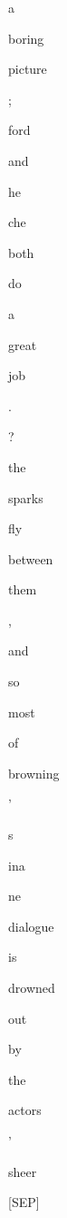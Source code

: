 \documentclass[varwidth=150mm]{standalone}
\begin{document}
\begin{CJK*}{UTF8}{gbsn}
{{{\colorbox{red!2.252366542816162}{\strut a} \colorbox{red!0.0}{\strut boring} \colorbox{red!11.16667366027832}{\strut picture} \colorbox{red!1.7491276264190674}{\strut ;} \colorbox{red!4.821642875671387}{\strut ford} \colorbox{red!0.0}{\strut and} \colorbox{red!0.0}{\strut he}\colorbox{red!1.1487184762954712}{\strut che} \colorbox{red!0.0}{\strut both} \colorbox{red!0.0}{\strut do} \colorbox{red!0.0}{\strut a} \colorbox{red!0.0}{\strut great} \colorbox{red!2.1898319721221924}{\strut job} \colorbox{red!1.303698182106018}{\strut .} \colorbox{red!18.185821533203125}{\strut ?} \colorbox{red!4.2095866203308105}{\strut the} \colorbox{red!1.4970024824142456}{\strut sparks} \colorbox{red!1.4905855655670166}{\strut fly} \colorbox{red!0.0}{\strut between} \colorbox{red!2.865899085998535}{\strut them} \colorbox{red!0.0}{\strut ,} \colorbox{red!9.971415519714355}{\strut and} \colorbox{red!3.6003265380859375}{\strut so} \colorbox{red!0.0}{\strut most} \colorbox{red!1.2356929779052734}{\strut of} \colorbox{red!4.911710262298584}{\strut browning} \colorbox{red!1.8380047082901}{\strut '} \colorbox{red!2.6674582958221436}{\strut s} \colorbox{red!10.292791366577148}{\strut ina}\colorbox{red!4.768868446350098}{\strut ne} \colorbox{red!29.677532196044922}{\strut dialogue} \colorbox{red!2.2694103717803955}{\strut is} \colorbox{red!0.0}{\strut drowned} \colorbox{red!0.0}{\strut out} \colorbox{red!1.4350879192352295}{\strut by} \colorbox{red!4.334221839904785}{\strut the} \colorbox{red!14.319491386413574}{\strut actors} \colorbox{red!2.2956960201263428}{\strut '} \colorbox{red!7.247280597686768}{\strut sheer} \colorbox{red!8.8955717086792}{\strut [SEP]}
}}}
\end{CJK*}
\end{document}
